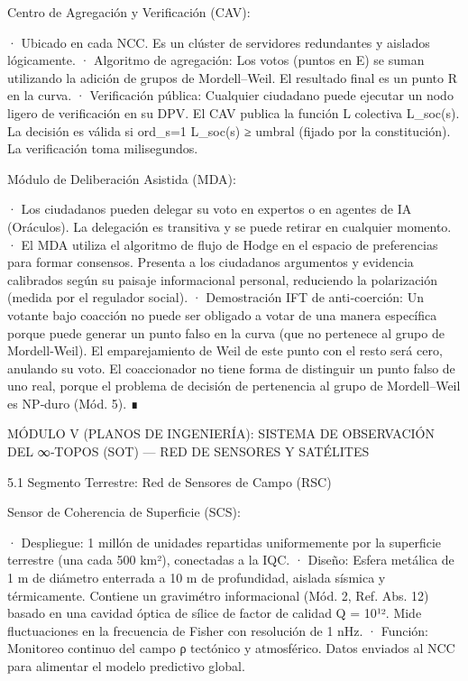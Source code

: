 \documentclass[12pt,a4paper]{book}
\begin{document}
Centro de Agregación y Verificación (CAV):

· Ubicado en cada NCC. Es un clúster de servidores redundantes y aislados lógicamente.
· Algoritmo de agregación: Los votos (puntos en E) se suman utilizando la adición de grupos de Mordell–Weil. El resultado final es un punto R en la curva.
· Verificación pública: Cualquier ciudadano puede ejecutar un nodo ligero de verificación en su DPV. El CAV publica la función L colectiva L_soc(s). La decisión es válida si ord_{s=1} L_soc(s) ≥ umbral (fijado por la constitución). La verificación toma milisegundos.

Módulo de Deliberación Asistida (MDA):

· Los ciudadanos pueden delegar su voto en expertos o en agentes de IA (Oráculos). La delegación es transitiva y se puede retirar en cualquier momento.
· El MDA utiliza el algoritmo de flujo de Hodge en el espacio de preferencias para formar consensos. Presenta a los ciudadanos argumentos y evidencia calibrados según su paisaje informacional personal, reduciendo la polarización (medida por el regulador social).
· Demostración IFT de anti‑coerción: Un votante bajo coacción no puede ser obligado a votar de una manera específica porque puede generar un punto falso en la curva (que no pertenece al grupo de Mordell‑Weil). El emparejamiento de Weil de este punto con el resto será cero, anulando su voto. El coaccionador no tiene forma de distinguir un punto falso de uno real, porque el problema de decisión de pertenencia al grupo de Mordell–Weil es NP‑duro (Mód. 5). ∎

MÓDULO V (PLANOS DE INGENIERÍA): SISTEMA DE OBSERVACIÓN DEL ∞‑TOPOS (SOT) — RED DE SENSORES Y SATÉLITES

5.1 Segmento Terrestre: Red de Sensores de Campo (RSC)

Sensor de Coherencia de Superficie (SCS):

· Despliegue: 1 millón de unidades repartidas uniformemente por la superficie terrestre (una cada 500 km²), conectadas a la IQC.
· Diseño: Esfera metálica de 1 m de diámetro enterrada a 10 m de profundidad, aislada sísmica y térmicamente. Contiene un gravimétro informacional (Mód. 2, Ref. Abs. 12) basado en una cavidad óptica de sílice de factor de calidad Q = 10¹². Mide fluctuaciones en la frecuencia de Fisher con resolución de 1 nHz.
· Función: Monitoreo continuo del campo ρ tectónico y atmosférico. Datos enviados al NCC para alimentar el modelo predictivo global.
\end{document}
